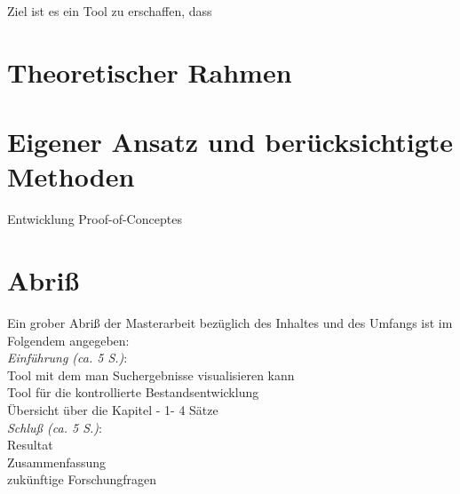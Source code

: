 \documentclass[10pt,a4paper,twocolumn,conference]{IEEEtran}
\begin{document}
Ziel ist es ein Tool zu erschaffen, dass 
\section{Theoretischer Rahmen}
\blindtext
\section{Eigener Ansatz und berücksichtigte Methoden}
Entwicklung Proof-of-Conceptes
\section{Abriß}
Ein grober Abriß der Masterarbeit bezüglich des Inhaltes und des Umfangs ist im
Folgendem angegeben:\\
\textit{Einführung (ca. 5 S.)}:\\Tool mit dem man Suchergebnisse visualisieren kann\\
Tool für die kontrollierte Bestandsentwicklung\\Übersicht über die Kapitel - 1-
4 Sätze\\
\textit{Schluß (ca. 5 S.)}:\\
Resultat\\
Zusammenfassung\\
zukünftige Forschungfragen
            

 
\end{document}
